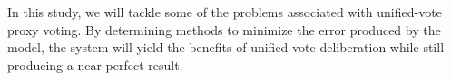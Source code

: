 In this study, we will tackle some of the problems associated with unified-vote proxy
voting.
By determining methods to minimize the error produced by the model, the system will
yield the benefits of unified-vote deliberation while still producing a near-perfect
result.




